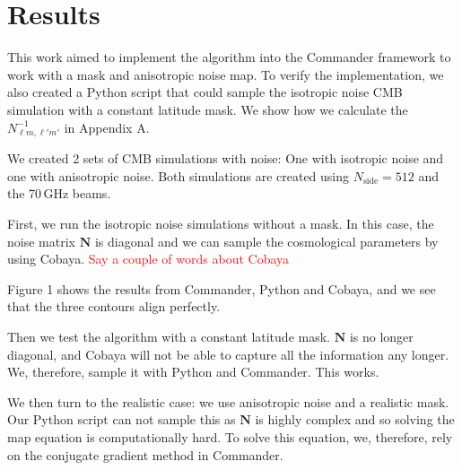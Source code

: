 \documentclass[twocolumn]{../common/aa}
\begin{document}
\section{Results}
\label{sec:results}

This work aimed to implement the algorithm into the Commander framework to work with a mask and anisotropic noise map. To verify the implementation, we also created a Python script that could sample the isotropic noise CMB simulation with a constant latitude mask. We show how we calculate the $N^{-1}_{\ell m, \ell' m'}$ in Appendix A.

We created 2 sets of CMB simulations with noise: One with isotropic noise and one with anisotropic noise. Both simulations are created using $N_{\textrm{side}}=512$ and the 70\,GHz beams.

First, we run the isotropic noise simulations without a mask. In this case, the noise matrix $\textbf{N}$ is diagonal and we can sample the cosmological parameters by using Cobaya. \textcolor{red}{Say a couple of words about Cobaya}

Figure 1 shows the results from Commander, Python and Cobaya, and we see that the three contours align perfectly.

Then we test the algorithm with a constant latitude mask. $\textbf{N}$ is no longer diagonal, and Cobaya will not be able to capture all the information any longer. We, therefore, sample it with Python and Commander. This works.

We then turn to the realistic case: we use anisotropic noise and a realistic mask. Our Python script can not sample this as $\textbf{N}$ is highly complex and so solving the map equation is computationally hard. To solve this equation, we, therefore, rely on the conjugate gradient method in Commander.
\end{document}
